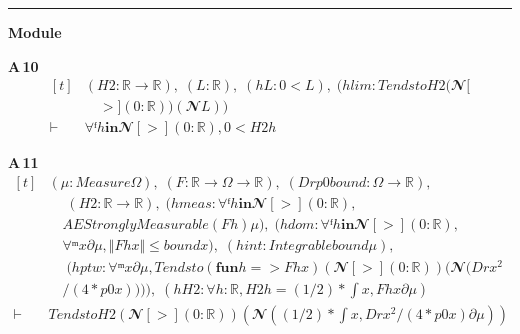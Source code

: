 \vspace{4pt}\noindent\rule{\columnwidth}{0.4pt}\par\vspace{2pt}
\noindent\textbf{Module }\par\vspace{3pt}

\noindent\textbf{A\,10}\quad{}
{\footnotesize\[ \begin{aligned}[t]
&(\mathit{H2} : \mathbb{R} \to \mathbb{R} ),\; (\mathit{L} : \mathbb{R} ),\; (\mathit{hL} : 0 < \mathit{L}),\; (\mathit{hlim} : \mathit{Tendsto} \mathit{H2} (𝓝[\\
&\quad >] (0:\mathbb{R} )) (𝓝 \mathit{L}))\\
\vdash\;&\forall  ᶠ \mathit{h} \mathbf{in} 𝓝[>] (0:\mathbb{R} ), 0 < \mathit{H2} \mathit{h}
\end{aligned} \]}

\noindent\textbf{A\,11}\quad{}
{\footnotesize\[ \begin{aligned}[t]
&(\mu : \mathit{Measure} \Omega ),\; (\mathit{F} : \mathbb{R} \to \Omega \to \mathbb{R} ),\; (\mathit{Dr} \mathit{p0} \mathit{bound} : \Omega \to \mathbb{R} ),\\
&\quad \; (\mathit{H2} : \mathbb{R} \to \mathbb{R} ),\; (\mathit{hmeas} : \forall  ᶠ \mathit{h} \mathbf{in} 𝓝[>] (0:\mathbb{R} ),\\
&\quad \mathit{AEStronglyMeasurable} (\mathit{F} \mathit{h}) \mu ),\; (\mathit{hdom} : \forall  ᶠ \mathit{h} \mathbf{in} 𝓝[>] (0:\mathbb{R} ),\\
&\quad \forall  ᵐ \mathit{x} ∂\mu , \Vert \mathit{F} \mathit{h} \mathit{x}\Vert \leq \mathit{bound} \mathit{x}),\; (\mathit{hint} : \mathit{Integrable} \mathit{bound} \mu ),\\
&\quad \; (\mathit{hptw} : \forall  ᵐ \mathit{x} ∂\mu , \mathit{Tendsto} (\mathbf{fun} \mathit{h} => \mathit{F} \mathit{h} \mathit{x}) (𝓝[>] (0:\mathbb{R} )) (𝓝 (\mathit{Dr} \mathit{x} ^{2}\\
&\quad / (4 * \mathit{p0} \mathit{x})))),\; (\mathit{hH2} : \forall \mathit{h} : \mathbb{R} , \mathit{H2} \mathit{h} = (1/2) * \int \mathit{x}, \mathit{F} \mathit{h} \mathit{x} ∂\mu )\\
\vdash\;&\mathit{Tendsto} \mathit{H2} (𝓝[>] (0:\mathbb{R} )) (𝓝 ((1/2) * \int \mathit{x}, \mathit{Dr} \mathit{x} ^{2} / (4 * \mathit{p0} \mathit{x}) ∂\mu ))
\end{aligned} \]}


